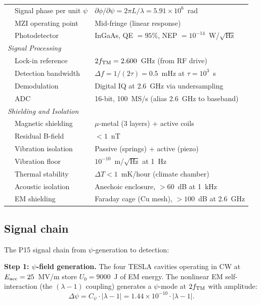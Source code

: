 \documentclass[11pt]{article}
\newcommand{\ee}[1]{\times 10^{#1}}
\newcommand{\lam}{\lambda}
\begin{document}
\begin{table}[H]
\begin{tabular}{lll}
& Signal phase per unit $\psi$ & $\partial\phi/\partial\psi = 2\pi L/\lambda = 5.91\ee{6}$~rad \\
& MZI operating point & Mid-fringe (linear response) \\
& Photodetector & InGaAs, QE $= 95\%$, NEP $= 10^{-14}$~W/$\sqrt{\text{Hz}}$ \\
\midrule
\multicolumn{3}{l}{\textit{Signal Processing}} \\
& Lock-in reference & $2f_{\rm TM} = 2.600$~GHz (from RF drive) \\
& Detection bandwidth & $\Delta f = 1/(2\tau) = 0.5$~mHz at $\tau = 10^3$~s \\
& Demodulation & Digital IQ at 2.6~GHz via undersampling \\
& ADC & 16-bit, 100~MS/s (alias 2.6~GHz to baseband) \\
\midrule
\multicolumn{3}{l}{\textit{Shielding and Isolation}} \\
& Magnetic shielding & $\mu$-metal (3 layers) + active coils \\
& Residual B-field & $< 1$~nT \\
& Vibration isolation & Passive (springs) + active (piezo) \\
& Vibration floor & $10^{-10}$~m/$\sqrt{\text{Hz}}$ at 1~Hz \\
& Thermal stability & $\Delta T < 1$~mK/hour (climate chamber) \\
& Acoustic isolation & Anechoic enclosure, $> 60$~dB at 1~kHz \\
& EM shielding & Faraday cage (Cu mesh), $> 100$~dB at 2.6~GHz \\
\bottomrule
\end{tabular}
\label{tab:phase1-params}
\end{table}

\subsection{Signal chain}

The P15 signal chain from $\psi$-generation to detection:

\textbf{Step 1: $\psi$-field generation.}
The four TESLA cavities operating in CW at $E_{\rm acc} = 25$~MV/m
store $U_0 = 9000$~J of EM energy. The nonlinear EM self-interaction
(the $(\lam-1)$ coupling) generates a $\psi$-mode at $2f_{\rm TM}$
with amplitude:
\begin{equation}
\Delta\psi = C_\psi \cdot |\lam-1|
= 1.44\ee{-10} \cdot |\lam-1|.
\label{eq:Cpsi-recall}
\end{equation}
\end{document}

